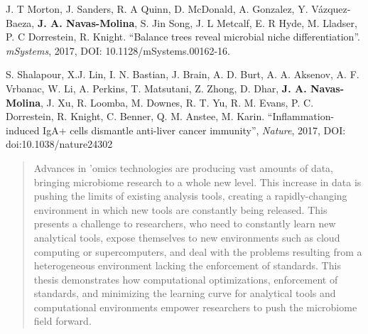 \begin{frontmatter}
\begin{vitapage}
\begin{publications}
	\item J. T Morton, J. Sanders, R. A Quinn, D. McDonald, A. Gonzalez, Y. V\'azquez-Baeza, \textbf{J. A. Navas-Molina}, S. Jin Song, J. L Metcalf, E. R Hyde, M. Lladser, P. C Dorrestein, R. Knight. ``Balance trees reveal microbial niche differentiation''. \emph{mSystems}, 2017, DOI: 10.1128/mSystems.00162-16.

    \item S. Shalapour, X.J. Lin, I. N. Bastian, J. Brain, A. D. Burt, A. A. Aksenov, A. F. Vrbanac, W. Li, A. Perkins, T. Matsutani, Z. Zhong, D. Dhar, \textbf{J. A. Navas-Molina}, J. Xu, R. Loomba, M. Downes, R. T. Yu, R. M. Evans, P. C. Dorrestein, R. Knight, C. Benner, Q. M. Anstee, M. Karin. ``Inflammation-induced IgA+ cells dismantle anti-liver cancer immunity'', \emph{Nature}, 2017, DOI: doi:10.1038/nature24302

\end{publications}


\end{vitapage}


%
%
\begin{abstract}

	Advances in 'omics technologies are producing vast amounts of data, bringing
	microbiome research to a whole new level. This increase in data is pushing the
	limits of existing analysis tools, creating a rapidly-changing environment in which
	new tools are constantly being released. This presents a challenge to
	researchers, who need to constantly learn new analytical tools, expose
	themselves to new environments such as cloud computing or supercomputers,
    and deal with the problems resulting from a heterogeneous environment
	lacking the enforcement of standards. This thesis demonstrates how computational
	optimizations, enforcement of standards, and minimizing the learning curve for
	analytical tools and computational environments empower researchers to push
	the microbiome field forward.


\end{abstract}
\end{frontmatter}
